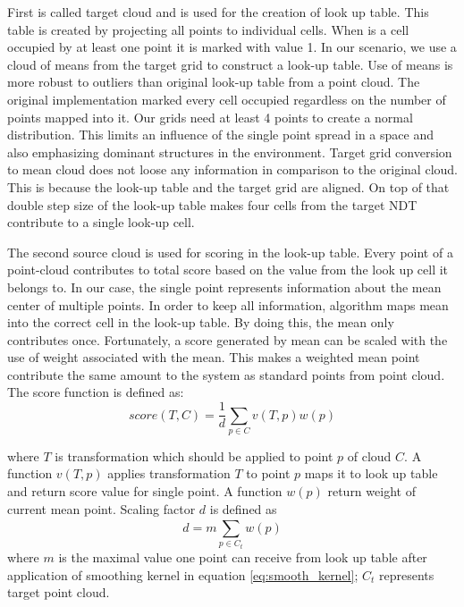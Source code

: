 First is called target cloud and is used for the creation of look up table. This table is created by projecting all points to individual cells. When is a cell occupied by at least one point it is marked with value 1. In our scenario, we use a cloud of means from the target grid to construct a look-up table. Use of means is more robust to outliers than original look-up table from a point cloud. The original implementation marked every cell occupied regardless on the number of points mapped into it. Our grids need at least 4 points to create a normal distribution. This limits an influence of the single point spread in a space and also emphasizing dominant structures in the environment. Target grid conversion to mean cloud does not loose any information in comparison to the original cloud. This is because the look-up table and the target grid are aligned. On top of that double step size of the look-up table makes four cells from the target \gls{NDT} contribute to a single look-up cell.
  
The second source cloud is used for scoring in the look-up table. Every point of a point-cloud contributes to total score based on the value from the look up cell it belongs to. In our case, the single point represents information about the mean center of multiple points. In order to keep all information, algorithm maps mean into the correct cell in the look-up table. By doing this, the mean only contributes once. Fortunately, a score generated by mean can be scaled with the use of weight associated with the mean. This makes a weighted mean point contribute the same amount to the system as standard points from point cloud. The score function is defined as:
\begin{equation}
score(T,C) = \frac{1}{d}\sum_{p \in C}^{} v(T,p) w(p) 
\end{equation}

where $T$ is transformation which should be applied to point $p$ of cloud $C$. A function $v(T,p)$ applies transformation $T$ to point $p$ maps it to look up table and return score value for single point. A function $w(p)$ return weight of current mean point. Scaling factor $d$ is defined as
\begin{equation}
d = m\sum_{p \in C_{t}}^{}w(p)
\end{equation} 
where $m$ is the maximal value one point can receive from look up table after application of smoothing kernel in equation \ref{eq:smooth_kernel}; $C_{t}$ represents target point cloud. 

